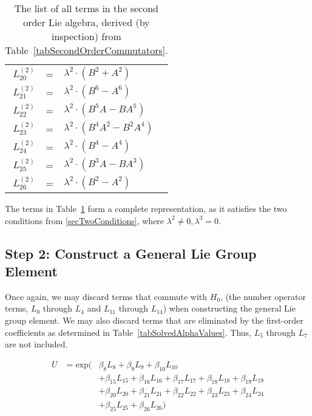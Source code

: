 \documentclass{article}
\begin{document}
\begin{table}[!hp]
\begin{center}
\begin{tabular}{rcl}
$L_{20}^{(2)}$ & = & ${\lambda}^{2}{\cdot}(B^{2}+A^{2})$ \\
$L_{21}^{(2)}$ & = & ${\lambda}^{2}{\cdot}(B^{6}-A^{6})$ \\
$L_{22}^{(2)}$ & = & ${\lambda}^{2}{\cdot}(B^{5}A-BA^{5})$ \\
$L_{23}^{(2)}$ & = & ${\lambda}^{2}{\cdot}(B^{4}A^{2}-B^{2}A^{4})$ \\
$L_{24}^{(2)}$ & = & ${\lambda}^{2}{\cdot}(B^{4}-A^{4})$ \\
$L_{25}^{(2)}$ & = & ${\lambda}^{2}{\cdot}(B^{3}A-BA^{3})$ \\
$L_{26}^{(2)}$ & = & ${\lambda}^{2}{\cdot}(B^{2}-A^{2})$
\end{tabular}
\caption{The list of all terms in the second order Lie algebra, derived (by inspection) from Table~\ref{tabSecondOrderCommutators}. \label{tabSecondOrderCompleteTermList}}
\end{center}
\end{table}

The terms in Table~\ref{tabSecondOrderCompleteTermList} form a complete representation, as it satisfies the two conditions from \ref{secTwoConditions}, where $\lambda^{2} \neq 0, \lambda^{3} = 0$.

\clearpage
\newpage

\subsection{Step 2: Construct a General Lie Group Element}

Once again, we may discard terms that commute with $H_{0}$, (the number operator terms, $L_{0}$ through $L_{4}$ and $L_{11}$ through $L_{14}$) when constructing the general Lie group element.  We may also discard terms that are eliminated by the first-order coefficients as determined in Table~\ref{tabSolvedAlphaValues}.  Thus, $L_{5}$ through $L_{7}$ are not included.

\begin{eqnarray}
U & = \textrm{exp}( & \beta_{8}L_{8}+\beta_{9}L_{9}+\beta_{10}L_{10} \\
  &                 & +\beta_{15}L_{15}+\beta_{16}L_{16}+\beta_{17}L_{17}+\beta_{18}L_{18}+\beta_{19}L_{19} \nonumber \\
  &                 & +\beta_{20}L_{20}+\beta_{21}L_{21}+\beta_{22}L_{22}+\beta_{23}L_{23}+\beta_{24}L_{24} \nonumber \\
  &                 & +\beta_{25}L_{25}+\beta_{26}L_{26} ) \nonumber
\end{eqnarray}
\end{document}
